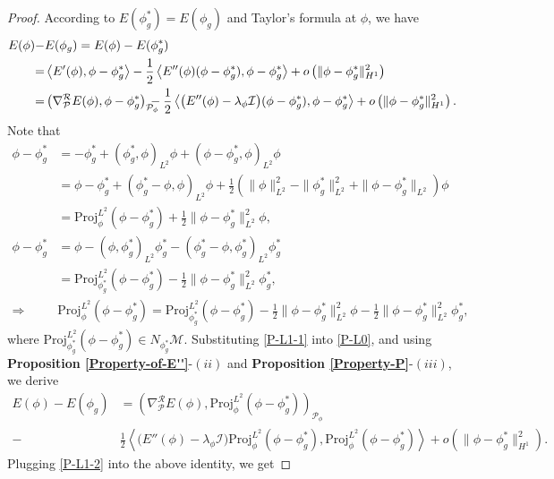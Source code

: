 \documentclass[preprint,3p]{elsarticle}
\begin{document}
\begin{proof}
	According to $E(\phi_g^*)=E(\phi_g)$ and Taylor's formula at $\phi$, we have
	\begin{align}
		\nonumber E(\phi)-&E(\phi_g)=E(\phi)-E(\phi_g^*)\\
		\nonumber=&\left\langle E'(\phi),\phi-\phi_g^*\right\rangle-\frac{1}{2}\left\langle E''(\phi)(\phi-\phi_g^*),\phi-\phi_g^*\right\rangle+o\left(\|\phi-\phi_g^*\|^2_{H^1}\right)\\
		=&\left( \nabla^{\mathcal{R}}_{\mathcal{P}} E(\phi),\phi-\phi_g^*\right)_{\mathcal{P}_{\phi}}\hspace{-0.32cm}-\frac{1}{2}\left\langle \big(E''(\phi)-\lambda_{\phi}\mathcal{I}\big)(\phi-\phi_g^*),\phi-\phi_g^*\right\rangle+o\left(\|\phi-\phi_g^*\|^2_{H^1}\right)\label{P-L0}.
	\end{align}
	Note that
	\begin{align}
		\nonumber\phi-\phi_g^*&=-\phi_g^*+(\phi_g^*,\phi)_{L^2}\phi+(\phi-\phi_g^*,\phi)_{L^2}\phi\\
		\nonumber&=\phi-\phi_g^*+(\phi_g^*-\phi,\phi)_{L^2}\phi+\frac{1}{2}\left(\|\phi\|_{L^2}^2-\|\phi_g^*\|_{L^2}^2+\|\phi-\phi_g^*\|_{L^2}\right)\phi\\
		&=\text{Proj}^{L^2}_{\phi}(\phi-\phi_g^*)+\frac{1}{2}\|\phi-\phi_g^*\|^2_{L^2}\phi,\label{P-L1-1}\\
		\nonumber\phi-\phi_g^*&=\phi-(\phi,\phi_g^*)_{L^2}\phi_g^*-(\phi_g^*-\phi,\phi_g^*)_{L^2}\phi_g^*\\
		&=\text{Proj}^{L^2}_{\phi_g^*}(\phi-\phi_g^*)-\frac{1}{2}\|\phi-\phi_g^*\|^2_{L^2}\phi_g^*,\label{P-L1}\\
		\Longrightarrow\;&\text{Proj}^{L^2}_{\phi}(\phi-\phi_g^*)=\text{Proj}^{L^2}_{\phi_g^*}(\phi-\phi_g^*)-\frac{1}{2}\|\phi-\phi_g^*\|^2_{L^2}\phi-\frac{1}{2}\|\phi-\phi_g^*\|^2_{L^2}\phi_g^*,\label{P-L1-2}
	\end{align}
	where $\text{Proj}^{L^2}_{\phi_g^*}(\phi-\phi_g^*)\in N_{\phi_g^*}\mathcal{M}$.
	Substituting \eqref{P-L1-1} into \eqref{P-L0}, and using {\bf Proposition \ref{Property-of-E''}}-$(ii)$ and {\bf Proposition \ref{Property-P}}-$(iii)$, we derive
	\begin{align*}
		E(\phi)-E(\phi_g)&=\left( \nabla^{\mathcal{R}}_{\mathcal{P}} E(\phi),\text{Proj}^{L^2}_{\phi}(\phi-\phi_g^*)\right)_{\mathcal{P}_{\phi}}\\
		\nonumber-&\frac{1}{2}\left\langle \big(E''(\phi)-\lambda_{\phi}\mathcal{I}\big)\text{Proj}^{L^2}_{\phi}(\phi-\phi_g^*),\text{Proj}^{L^2}_{\phi}(\phi-\phi_g^*)\right\rangle+o\left(\|\phi-\phi_g^*\|^2_{H^1}\right).
	\end{align*}
	Plugging \eqref{P-L1-2} into the above identity, we get
	

\end{proof}
\end{document}
